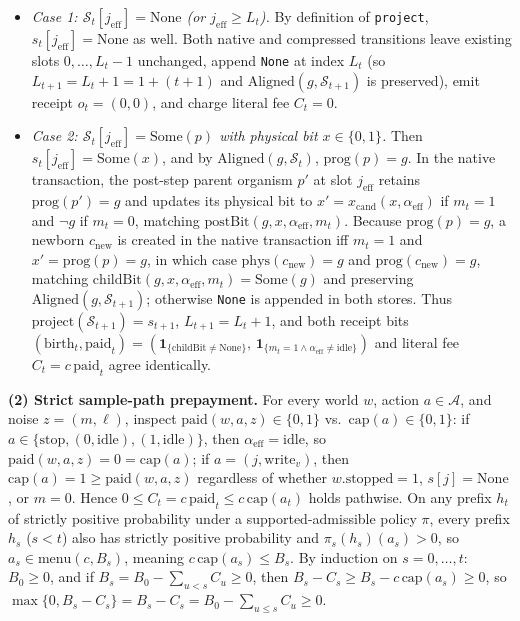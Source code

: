 \documentclass[11pt,letterpaper]{article}
\providecommand{\tightlist}{\setlength{\itemsep}{2pt}\setlength{\parskip}{0pt}}
\begin{document}
\begin{itemize}
\tightlist
\item
  \emph{Case 1: \(\mathcal{S}_t[j_{\mathrm{eff}}] = \mathrm{None}\) (or
  \(j_{\mathrm{eff}} \ge L_t\)).} By definition of \texttt{project},
  \(s_t[j_{\mathrm{eff}}] = \mathrm{None}\) as well. Both native and
  compressed transitions leave existing slots \(0, \dots, L_t - 1\)
  unchanged, append \texttt{None} at index \(L_t\) (so
  \(L_{t+1} = L_t + 1 = 1 + (t+1)\) and
  \(\mathrm{Aligned}(g, \mathcal{S}_{t+1})\) is preserved), emit receipt
  \(o_t = (0,0)\), and charge literal fee \(C_t = 0\).
\item
  \emph{Case 2: \(\mathcal{S}_t[j_{\mathrm{eff}}] = \mathrm{Some}(p)\)
  with physical bit \(x \in \{0,1\}\).} Then
  \(s_t[j_{\mathrm{eff}}] = \mathrm{Some}(x)\), and by
  \(\mathrm{Aligned}(g, \mathcal{S}_t)\), \(\mathrm{prog}(p) = g\). In
  the native transaction, the post-step parent organism \(p'\) at slot
  \(j_{\mathrm{eff}}\) retains \(\mathrm{prog}(p') = g\) and updates its
  physical bit to \(x' = x_{\mathrm{cand}}(x, \alpha_{\mathrm{eff}})\)
  if \(m_t = 1\) and \(\neg g\) if \(m_t = 0\), matching
  \(\mathrm{postBit}(g, x, \alpha_{\mathrm{eff}}, m_t)\). Because
  \(\mathrm{prog}(p) = g\), a newborn \(c_{\mathrm{new}}\) is created in
  the native transaction iff \(m_t = 1\) and
  \(x' = \mathrm{prog}(p) = g\), in which case
  \(\mathrm{phys}(c_{\mathrm{new}}) = g\) and
  \(\mathrm{prog}(c_{\mathrm{new}}) = g\), matching
  \(\mathrm{childBit}(g, x, \alpha_{\mathrm{eff}}, m_t) = \mathrm{Some}(g)\)
  and preserving \(\mathrm{Aligned}(g, \mathcal{S}_{t+1})\); otherwise
  \texttt{None} is appended in both stores. Thus
  \(\mathrm{project}(\mathcal{S}_{t+1}) = s_{t+1}\),
  \(L_{t+1} = L_t + 1\), and both receipt bits
  \((\mathrm{birth}_t, \mathrm{paid}_t) = (\mathbf{1}_{\{\mathrm{childBit} \neq \mathrm{None}\}},\, \mathbf{1}_{\{m_t = 1 \land \alpha_{\mathrm{eff}} \neq \mathrm{idle}\}})\)
  and literal fee \(C_t = c\,\mathrm{paid}_t\) agree identically.
\end{itemize}

\textbf{(2) Strict sample-path prepayment.} For every world \(w\),
action \(a \in \mathcal{A}\), and noise \(z = (m, \ell)\), inspect
\(\mathrm{paid}(w, a, z) \in \{0,1\}\)
vs.~\(\mathrm{cap}(a) \in \{0,1\}\): if
\(a \in \{\mathrm{stop}, (0,\mathrm{idle}), (1,\mathrm{idle})\}\), then
\(\alpha_{\mathrm{eff}} = \mathrm{idle}\), so
\(\mathrm{paid}(w,a,z) = 0 = \mathrm{cap}(a)\); if
\(a = (j, \mathrm{write}_v)\), then
\(\mathrm{cap}(a) = 1 \ge \mathrm{paid}(w,a,z)\) regardless of whether
\(w.\mathrm{stopped} = 1\), \(s[j] = \mathrm{None}\), or \(m = 0\).
Hence \(0 \le C_t = c\,\mathrm{paid}_t \le c\,\mathrm{cap}(a_t)\) holds
pathwise. On any prefix \(h_t\) of strictly positive probability under a
supported-admissible policy \(\pi\), every prefix \(h_s\) (\(s < t\))
also has strictly positive probability and \(\pi_s(h_s)(a_s) > 0\), so
\(a_s \in \mathrm{menu}(c, B_s)\), meaning
\(c\,\mathrm{cap}(a_s) \le B_s\). By induction on \(s = 0, \dots, t\):
\(B_0 \ge 0\), and if \(B_s = B_0 - \sum_{u < s} C_u \ge 0\), then
\(B_s - C_s \ge B_s - c\,\mathrm{cap}(a_s) \ge 0\), so
\(\max\{0, B_s - C_s\} = B_s - C_s = B_0 - \sum_{u \le s} C_u \ge 0\).
\end{document}
